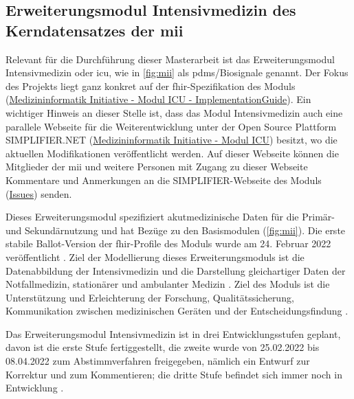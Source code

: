 \subsection{Erweiterungsmodul \glqq Intensivmedizin\grqq{} des Kerndatensatzes der \acs{mii}} \label{subsec:icumodul}

Relevant für die Durchführung dieser Masterarbeit ist das Erweiterungsmodul \glqq Intensivmedizin\grqq{} oder \ac{icu}, wie in \ref{fig:mii} als \acs{pdms}/Biosignale genannt. Der Fokus des Projekts liegt ganz konkret auf der \ac{fhir}-Spezifikation des Moduls (\href{https://www.medizininformatik-initiative.de/Kerndatensatz/Modul_Intensivmedizin/IGMIIKDSModulICU.html}{Medizininformatik Initiative - Modul ICU - ImplementationGuide}). Ein wichtiger Hinweis an dieser Stelle ist, dass das Modul \glqq Intensivmedizin\grqq{} auch eine parallele Webseite für die Weiterentwicklung unter der Open Source Plattform SIMPLIFIER.NET (\href{https://simplifier.net/medizininformatikinitiative-modul-intensivmedizin}{Medizininformatik Initiative - Modul ICU}) besitzt, wo die aktuellen Modifikationen veröffentlicht werden. Auf dieser Webseite können die Mitglieder der \ac{mii} und weitere Personen mit Zugang zu dieser Webseite Kommentare und Anmerkungen an die SIMPLIFIER-Webseite des Moduls (\href{https://simplifier.net/MedizininformatikInitiative-Modul-Intensivmedizin/~issues}{Issues}) senden.

Dieses Erweiterungsmodul spezifiziert akutmedizinische Daten für die Primär- und Sekundärnutzung und hat Bezüge zu den Basismodulen (\ref{fig:mii}). Die erste stabile Ballot-Version der \ac{fhir}-Profile des Moduls wurde am 24. Februar 2022 veröffentlicht \cite{modicu}. Ziel der Modellierung dieses Erweiterungsmoduls ist die Datenabbildung der Intensivmedizin und die Darstellung gleichartiger Daten der Notfallmedizin, stationärer und ambulanter Medizin \cite{icukdz}. Ziel des Moduls ist die Unterstützung und Erleichterung der Forschung, Qualitätssicherung, Kommunikation zwischen medizinischen Geräten und der Entscheidungsfindung \cite{modicuvid}.

Das Erweiterungsmodul \glqq Intensivmedizin\grqq{} ist in drei Entwicklungsstufen geplant, davon ist die erste Stufe fertiggestellt, die zweite wurde von 25.02.2022 bis 08.04.2022 zum Abstimmverfahren freigegeben, nämlich ein Entwurf zur Korrektur und zum Kommentieren; die dritte Stufe befindet sich immer noch in Entwicklung \cite{modicuvid}.

